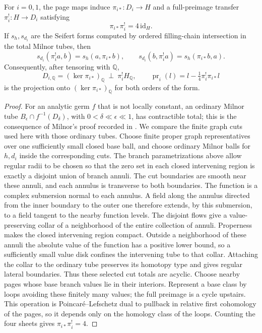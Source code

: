 \begin{lemma}\label{lem:cover-adjunction}
For \(i=0,1\), the page maps induce
\(\pi_{i*}:D_i\to H\) and a full-preimage transfer
\(\pi_i^!:H\to D_i\) satisfying
\[
 \pi_{i*}\pi_i^!=4\,\mathrm{id}_H .
\]
If \(s_h,s_{d_i}\) are the Seifert forms computed by ordered
filling-chain intersection in the total Milnor tubes, then
\[
 s_{d_i}(\pi_i^!a,b)=s_h(a,\pi_{i*}b),\qquad
 s_{d_i}(b,\pi_i^!a)=s_h(\pi_{i*}b,a).
\]
Consequently, after tensoring with \(\mathbb Q\),
\[
 D_{i,\mathbb Q}=(\ker\pi_{i*})_{\mathbb Q}
       \ \perp\ \pi_i^!H_{\mathbb Q},\qquad
 \operatorname{pr}_i(l)=l-\tfrac14\pi_i^!\pi_{i*}l
\]
is the projection onto \((\ker\pi_{i*})_{\mathbb Q}\) for both orders
of the form.
\end{lemma}

\begin{proof}
For an analytic germ \(f\) that is not locally constant, an ordinary
Milnor tube \(B_\epsilon\cap f^{-1}(D_\delta)\), with
\(0<\delta\ll\epsilon\ll1\), has contractible total; this is the
consequence of Milnor's proof recorded in
\cite[Theorem~1.8 and Remark~1.9]{Massey2015LeCycles}.
We compare the finite graph cuts used here with those ordinary tubes.
Choose finite proper graph representatives over one sufficiently small
closed base ball, and choose ordinary Milnor balls for \(h,d_i\) inside
the corresponding cuts. The branch parametrizations above allow regular
radii to be chosen so that the zero set in each closed intervening region
is exactly a disjoint union of branch annuli. The cut boundaries are
smooth near these annuli, and each annulus is transverse to both
boundaries. The function is a complex submersion normal to each annulus.
A field along the annulus directed from the inner boundary to the outer
one therefore extends, by this submersion, to a field tangent to the
nearby function levels. The disjoint flows give a value-preserving
collar of a neighborhood of the entire collection of annuli.
Properness makes the closed intervening region compact. Outside a
neighborhood of these annuli the absolute value of the function has a
positive lower bound, so a sufficiently small value disk confines the
intervening tube to that collar. Attaching the collar to the ordinary
tube preserves its homotopy type and gives regular lateral boundaries.
Thus these selected cut totals are acyclic. Choose nearby pages whose
base branch values lie in their interiors.
Represent a base class by loops avoiding these finitely many
values; the full preimage is a cycle upstairs.  This operation is
Poincar\'e--Lefschetz dual to pullback in relative first cohomology of
the pages, so it depends only on the homology class of the loops.
Counting the four sheets gives \(\pi_{i*}\pi_i^!=4\).


\end{proof}
